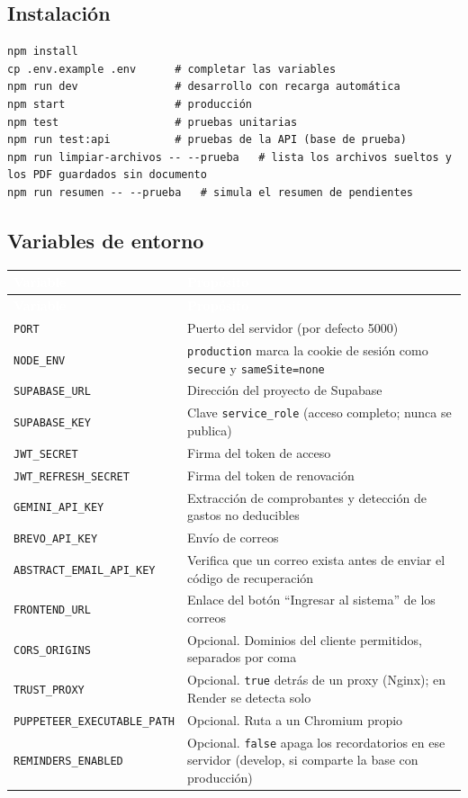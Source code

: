 \documentclass[11pt,letterpaper]{article}
\newcommand{\cabecera}{\rowcolor{maxamPrimario}}
\newcommand{\tth}[1]{\textcolor{white}{\textbf{#1}}}
\newcommand{\code}[1]{\nolinkurl{#1}}
\begin{document}
\subsection{Instalación}
\begin{lstlisting}
npm install
cp .env.example .env      # completar las variables
npm run dev               # desarrollo con recarga automática
npm start                 # producción
npm test                  # pruebas unitarias
npm run test:api          # pruebas de la API (base de prueba)
npm run limpiar-archivos -- --prueba   # lista los archivos sueltos y los PDF guardados sin documento
npm run resumen -- --prueba   # simula el resumen de pendientes
\end{lstlisting}

\subsection{Variables de entorno}

\begin{xltabular}{\textwidth}{L{4.6cm} Y}
\cabecera \tth{Variable} & \tth{Propósito} \\
\endfirsthead
\cabecera \tth{Variable} & \tth{Propósito} \\
\endhead
{} \code{PORT} & Puerto del servidor (por defecto 5000) \\
\code{NODE_ENV} & \code{production} marca la cookie de sesión como \code{secure} y \code{sameSite=none} \\
 \code{SUPABASE_URL} & Dirección del proyecto de Supabase \\
\code{SUPABASE_KEY} & Clave \code{service_role} (acceso completo; nunca se publica) \\
 \code{JWT_SECRET} & Firma del token de acceso \\
\code{JWT_REFRESH_SECRET} & Firma del token de renovación \\
 \code{GEMINI_API_KEY} & Extracción de comprobantes y detección de gastos no deducibles \\
\code{BREVO_API_KEY} & Envío de correos \\
 \code{ABSTRACT_EMAIL_API_KEY} & Verifica que un correo exista antes de enviar el código de recuperación \\
\code{FRONTEND_URL} & Enlace del botón ``Ingresar al sistema'' de los correos \\
 \code{CORS_ORIGINS} & Opcional. Dominios del cliente permitidos, separados por coma \\
\code{TRUST_PROXY} & Opcional. \code{true} detrás de un proxy (Nginx); en Render se detecta solo \\
 \code{PUPPETEER_EXECUTABLE_PATH} & Opcional. Ruta a un Chromium propio \\
\code{REMINDERS_ENABLED} & Opcional. \code{false} apaga los recordatorios en ese servidor (develop, si comparte la base con producción) \\
\end{xltabular}
\end{document}
